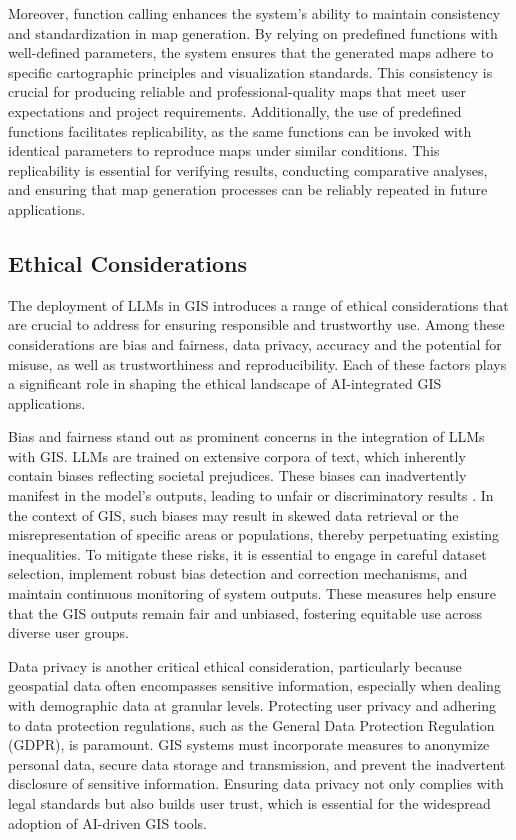 Moreover, function calling enhances the system's ability to maintain consistency and standardization in map generation. By relying on predefined functions with well-defined parameters, the system ensures that the generated maps adhere to specific cartographic principles and visualization standards. This consistency is crucial for producing reliable and professional-quality maps that meet user expectations and project requirements. Additionally, the use of predefined functions facilitates replicability, as the same functions can be invoked with identical parameters to reproduce maps under similar conditions. This replicability is essential for verifying results, conducting comparative analyses, and ensuring that map generation processes can be reliably repeated in future applications.

\subsection{Ethical Considerations}

The deployment of LLMs in GIS introduces a range of ethical considerations that are crucial to address for ensuring responsible and trustworthy use. Among these considerations are bias and fairness, data privacy, accuracy and the potential for misuse, as well as trustworthiness and reproducibility. Each of these factors plays a significant role in shaping the ethical landscape of AI-integrated GIS applications.

Bias and fairness stand out as prominent concerns in the integration of LLMs with GIS. LLMs are trained on extensive corpora of text, which inherently contain biases reflecting societal prejudices. These biases can inadvertently manifest in the model's outputs, leading to unfair or discriminatory results \cite{wang_aligning_2023, gallegos_bias_2024}. In the context of GIS, such biases may result in skewed data retrieval or the misrepresentation of specific areas or populations, thereby perpetuating existing inequalities. To mitigate these risks, it is essential to engage in careful dataset selection, implement robust bias detection and correction mechanisms, and maintain continuous monitoring of system outputs. These measures help ensure that the GIS outputs remain fair and unbiased, fostering equitable use across diverse user groups.

Data privacy is another critical ethical consideration, particularly because geospatial data often encompasses sensitive information, especially when dealing with demographic data at granular levels. Protecting user privacy and adhering to data protection regulations, such as the General Data Protection Regulation (GDPR), is paramount. GIS systems must incorporate measures to anonymize personal data, secure data storage and transmission, and prevent the inadvertent disclosure of sensitive information. Ensuring data privacy not only complies with legal standards but also builds user trust, which is essential for the widespread adoption of AI-driven GIS tools.

